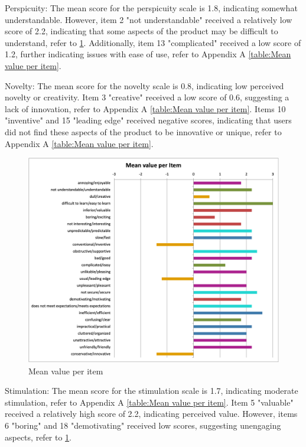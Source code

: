 \documentclass[conference,onecolumn]{IEEEtran}
\begin{document}
            Perspicuity: The mean score for the perspicuity scale is 1.8, indicating somewhat understandable. However, item 2 "not understandable" received a relatively low score of 2.2, indicating that some aspects of the product may be difficult to understand, refer to \figurename{\ref{Mean value per item}}. Additionally, item 13 "complicated" received a low score of 1.2, further indicating issues with ease of use, refer to Appendix A \tablename{ \ref{table:Mean value per item}}.
            
            Novelty: The mean score for the novelty scale is 0.8, indicating low perceived novelty or creativity. Item 3 "creative" received a low score of 0.6, suggesting a lack of innovation, refer to Appendix A \tablename{ \ref{table:Mean value per item}}. Items 10 "inventive" and 15 "leading edge" received negative scores, indicating that users did not find these aspects of the product to be innovative or unique, refer to Appendix A \tablename{ \ref{table:Mean value per item}}.
    
            \begin{figure}[H]
                \centerline{\includegraphics[width=150mm,scale=1]{./images/Result_Meanvalueperitem.png}}
                \caption{Mean value per item}
                \label{Mean value per item}
            \end{figure}

            Stimulation: The mean score for the stimulation scale is 1.7, indicating moderate stimulation, refer to Appendix A \tablename{ \ref{table:Mean value per item}}. Item 5 "valuable" received a relatively high score of 2.2, indicating perceived value. However, items 6 "boring" and 18 "demotivating" received low scores, suggesting unengaging aspects, refer to \figurename{\ref{Mean value per item}}.
\end{document}
